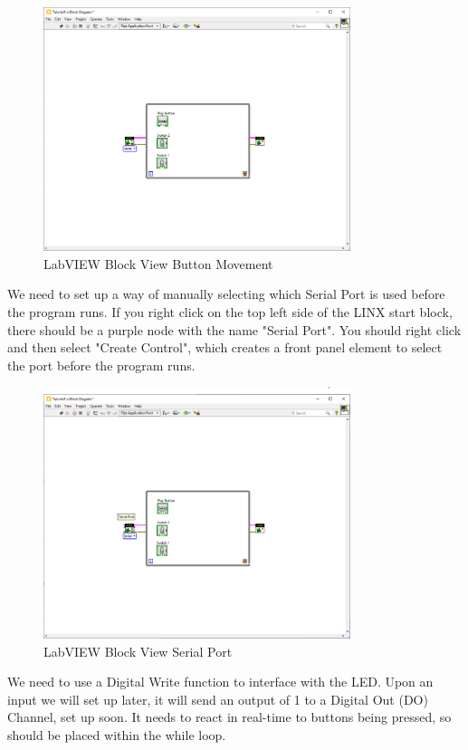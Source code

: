 \documentclass[a4paper,11pt]{report}
\begin{document}
\begin{figure}[H]
\centering
\includegraphics[width=0.8\textwidth]{screenshots/labview16}
\caption{LabVIEW Block View Button Movement}
\end{figure}

We need to set up a way of manually selecting which Serial Port is used before the program runs. If you right click on the top left side of the LINX start block, there should be a purple node with the name "Serial Port". You should right click and then select "Create Control", which creates a front panel element to select the port before the program runs.

\begin{figure}[H]
\centering
\includegraphics[width=0.8\textwidth]{screenshots/labview18}
\caption{LabVIEW Block View Serial Port}
\end{figure}

We need to use a Digital Write function to interface with the LED. Upon an input we will set up later, it will send an output of 1 to a Digital Out (DO) Channel, set up soon. It needs to react in real-time to buttons being pressed, so should be placed within the while loop.
\end{document}
